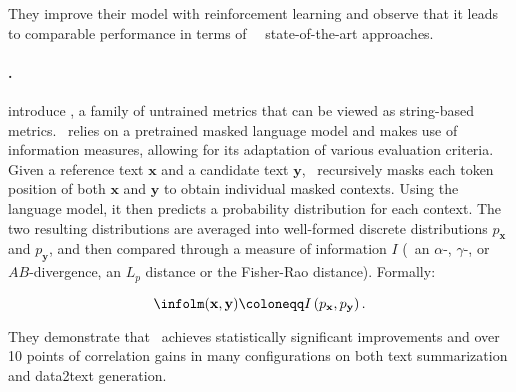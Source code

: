They improve their model with reinforcement learning and observe that it leads to comparable performance in terms of \rouge\ \wrt\ state-of-the-art approaches.

\paragraph{\infolm.}

\citet{colombo2021infolm} introduce \infolm, a family of untrained metrics that can be viewed as string-based metrics. \infolm\ relies on a pretrained masked language model and makes use of information measures, allowing for its adaptation of various evaluation criteria. Given a reference text $\mathbf{x}$ and a candidate text $\mathbf{y}$, \infolm\ recursively masks each token position of both $\mathbf{x}$ and $\mathbf{y}$ to obtain individual masked contexts. Using the language model, it then predicts a probability distribution for each context. The two resulting distributions are averaged into well-formed discrete distributions $p_\mathbf{x}$ and $p_\mathbf{y}$, and then compared through a measure of information $I$ (\eg\ an $\alpha$-, $\gamma$-, or $AB$-divergence, an $L_p$ distance or the Fisher-Rao distance). Formally:

\[ \infolm(\mathbf{x}, \mathbf{y}) \coloneqq I \left( p_\mathbf{x}, p_\mathbf{y} \right). \]

They demonstrate that \infolm\ achieves statistically significant improvements and over 10 points of correlation gains in many configurations on both text summarization and data2text generation.

